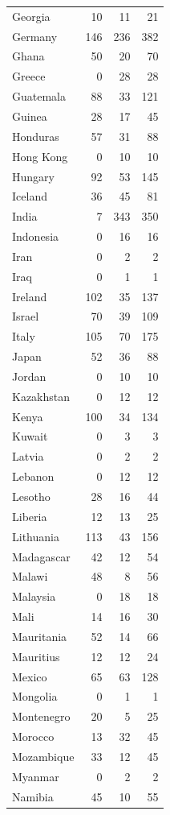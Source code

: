 \documentclass{article} %
\begin{document}
\begin{longtable}{l r r r}
Georgia & 10 & 11 & 21 \\
Germany & 146 & 236 & 382 \\
Ghana & 50 & 20 & 70 \\
Greece & 0 & 28 & 28 \\
Guatemala & 88 & 33 & 121 \\
Guinea & 28 & 17 & 45 \\
Honduras & 57 & 31 & 88 \\
Hong Kong & 0 & 10 & 10 \\
Hungary & 92 & 53 & 145 \\
Iceland & 36 & 45 & 81 \\
India & 7 & 343 & 350 \\
Indonesia & 0 & 16 & 16 \\
Iran & 0 & 2 & 2 \\
Iraq & 0 & 1 & 1 \\
Ireland & 102 & 35 & 137 \\
Israel & 70 & 39 & 109 \\
Italy & 105 & 70 & 175 \\
Japan & 52 & 36 & 88 \\
Jordan & 0 & 10 & 10 \\
Kazakhstan & 0 & 12 & 12 \\
Kenya & 100 & 34 & 134 \\
Kuwait & 0 & 3 & 3 \\
Latvia & 0 & 2 & 2 \\
Lebanon & 0 & 12 & 12 \\
Lesotho & 28 & 16 & 44 \\
Liberia & 12 & 13 & 25 \\
Lithuania & 113 & 43 & 156 \\
Madagascar & 42 & 12 & 54 \\
Malawi & 48 & 8 & 56 \\
Malaysia & 0 & 18 & 18 \\
Mali & 14 & 16 & 30 \\
Mauritania & 52 & 14 & 66 \\
Mauritius & 12 & 12 & 24 \\
Mexico & 65 & 63 & 128 \\
Mongolia & 0 & 1 & 1 \\
Montenegro & 20 & 5 & 25 \\
Morocco & 13 & 32 & 45 \\
Mozambique & 33 & 12 & 45 \\
Myanmar & 0 & 2 & 2 \\
Namibia & 45 & 10 & 55 \\

\end{longtable}
\end{document}
